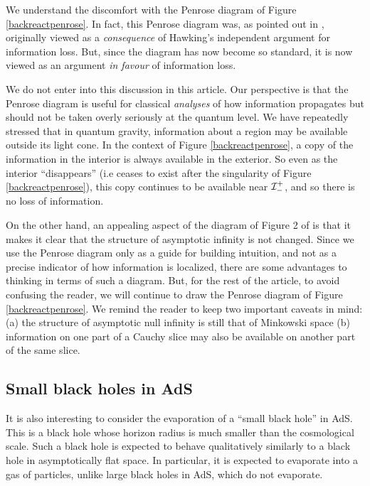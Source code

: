 \documentclass[12pt]{article}
\def \scrippast{{\cal I}^{+}_{-}}
\begin{document}
We understand the discomfort with the Penrose diagram of Figure \ref{backreactpenrose}. In fact, this Penrose diagram was, as pointed out in  \cite{Ashtekar:2020ifw}, originally viewed as a {\em consequence} of Hawking's independent argument for information loss. But, since the diagram has now become so standard, it is now viewed as an argument {\em in favour} of information loss.

We do not enter into this discussion in this article. Our perspective is that the Penrose diagram is useful for classical {\em analyses} of how information propagates but should not be taken overly seriously at the quantum level.  
We have repeatedly stressed that in quantum gravity, information about a region may be available outside its light cone. 
In the context of Figure \ref{backreactpenrose}, a copy of the information in the interior is always available in the exterior. So even as the interior ``disappears'' (i.e ceases to exist after the singularity of Figure \ref{backreactpenrose}), this copy continues to be available near $\scrippast$, and so there is no loss of information. 

On the other hand, an appealing aspect of the diagram of Figure 2 of \cite{Ashtekar:2020ifw}  is that it makes it clear that the structure of asymptotic infinity is not changed. Since we  use the Penrose diagram only as a guide for building intuition, and not as a precise indicator
of how information is localized, there are some advantages to thinking in terms of such a diagram.  But, for the rest of the article, to avoid confusing the reader, we will continue to draw the Penrose diagram of Figure \ref{backreactpenrose}. We remind the reader to keep two important caveats in mind: (a) the structure of asymptotic null infinity is still that of Minkowski space (b) information on one part of a Cauchy slice may also be available on another part of the same slice.




\subsection{Small black holes in AdS}


It is also interesting to consider the  evaporation of a ``small black hole'' in AdS. This is a black hole whose horizon radius is much smaller than the cosmological scale. Such a black hole is expected to behave qualitatively similarly to a black hole in asymptotically flat space. In particular, it is expected to evaporate into a gas of particles, unlike large black holes in AdS, which do not evaporate.
\end{document}
